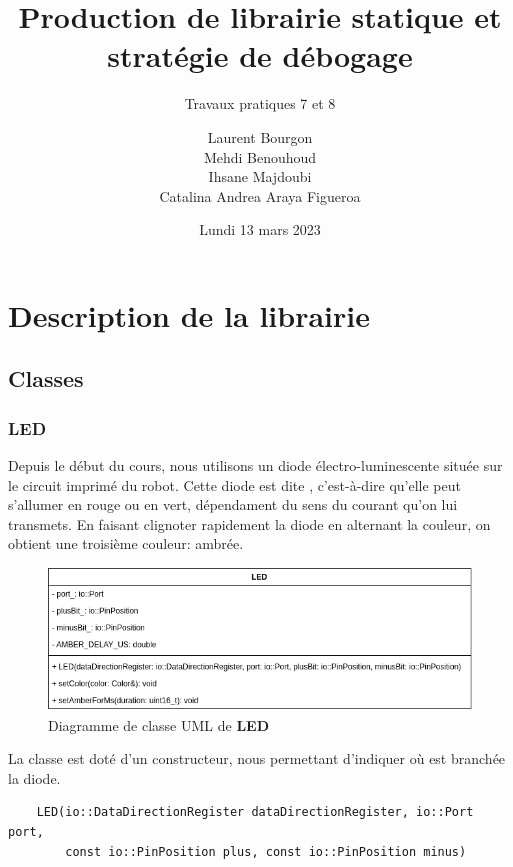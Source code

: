 \documentclass[12pt]{scrartcl}
\author{Laurent Bourgon \\Mehdi Benouhoud \\Ihsane Majdoubi \\Catalina Andrea Araya Figueroa}
\subtitle{Travaux pratiques 7 et 8}
\title{Production de librairie statique et stratégie de débogage}
\date{Lundi 13 mars 2023}
\begin{document}
\maketitle



\newpage

\section{Description de la librairie}

\subsection{Classes}
\subsubsection{LED}
Depuis le début du cours, nous utilisons un diode électro-luminescente située
sur le circuit imprimé du robot. Cette diode est dite  , c'est-à-dire
qu'elle peut s'allumer en rouge ou en vert, dépendament du sens du courant qu'on
lui transmets. En faisant clignoter rapidement la diode en alternant la couleur,
on obtient une troisième couleur: ambrée.

\begin{figure}[h]
    \centering
    \includegraphics[scale=0.5]{LED_diagramme_classe}
    \caption{Diagramme de classe UML de \textbf{LED}}
\end{figure}

La classe est doté d'un constructeur, nous permettant d'indiquer où est branchée
la diode.
\begin{verbatim}
    LED(io::DataDirectionRegister dataDirectionRegister, io::Port port,
        const io::PinPosition plus, const io::PinPosition minus)
\end{verbatim}
\end{document}
